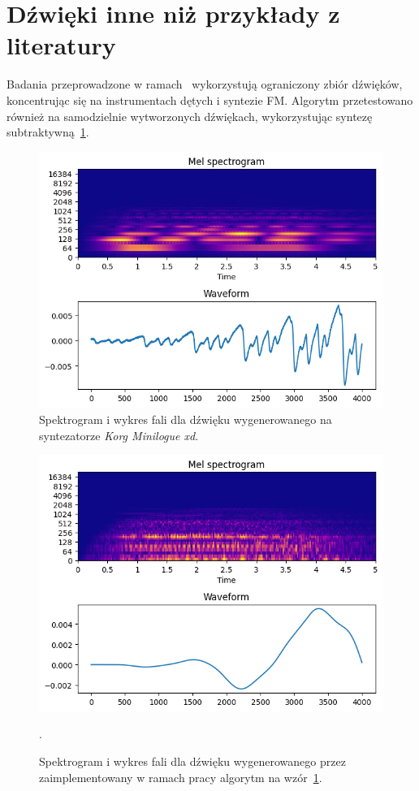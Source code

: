 \section{Dźwięki inne niż przykłady z literatury}\label{sec:non_literature_samples}

Badania przeprowadzone w ramach~\cite{evolutionary_puredata}
wykorzystują ograniczony zbiór dźwięków, koncentrując
się na instrumentach dętych i syntezie FM\@. Algorytm przetestowano
również na samodzielnie wytworzonych dźwiękach, wykorzystując syntezę
subtraktywną~\ref{fig:minilogue_target_sample}.

\begin{figure}[H]
    \centering
    \includegraphics[width=0.7\linewidth]{rys06/target_minilogue.png}
    \caption{
      Spektrogram i wykres fali dla dźwięku wygenerowanego 
      na syntezatorze \textit{Korg Minilogue xd}.
    }\label{fig:minilogue_target_sample}
\end{figure}

\begin{figure}[H]
    \centering
    \includegraphics[width=0.7\linewidth]{rys06/evolved_minilogue.png}
    \caption{
      Spektrogram i wykres fali dla dźwięku wygenerowanego 
      przez zaimplementowany w ramach pracy algorytm na
      wzór~\ref{fig:minilogue_target_sample}.
    }\label{fig:evolved_minilogue_sample}.
\end{figure}


